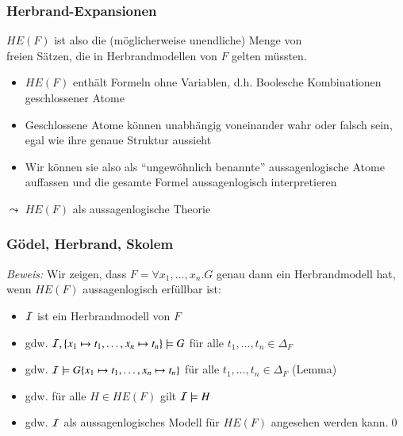\documentclass[aspectratio=1610,onlymath]{beamer}
\begin{document}
\begin{frame}\frametitle{Herbrand-Expansionen}


$HE(F)$ ist also die (möglicherweise unendliche) Menge von \\ freien Sätzen, die in Herbrandmodellen von $F$ gelten müssten.
\pause\bigskip

\begin{itemize}
\item $HE(F)$ enthält Formeln ohne Variablen, d.h. Boolesche Kombinationen geschlossener Atome
\item Geschlossene Atome können unabhängig voneinander wahr oder falsch sein, egal wie ihre genaue Struktur aussieht
\item Wir können sie also als "`ungewöhnlich benannte"' aussagenlogische Atome auffassen und die gesamte Formel aussagenlogisch interpretieren
\end{itemize}
\alert{$\leadsto$ $HE(F)$ als aussagenlogische Theorie}


\end{frame}

\begin{frame}\frametitle{Gödel, Herbrand, Skolem}

\pause

\emph{Beweis:} Wir zeigen, dass $F=\forall x_1,\ldots,x_n.G$ genau dann ein Herbrandmodell hat, wenn $HE(F)$ aussagenlogisch erfüllbar ist:\pause

\begin{itemize}
\item $\mathcal{I}$ ist ein Herbrandmodell von $F$\pause
\item gdw. $\mathcal{I},\{x_1\mapsto t_1,\ldots,x_n\mapsto t_n\}\models G$ für alle $t_1,\ldots,t_n\in\Delta_F$\pause
\item gdw. $\mathcal{I}\models G\{x_1\mapsto t_1,\ldots,x_n\mapsto t_n\}$ für alle $t_1,\ldots,t_n\in\Delta_F$ (Lemma)\pause
\item gdw. für alle $H\in HE(F)$ gilt $\mathcal{I}\models H$\pause
\item gdw. $\mathcal{I}$ als aussagenlogisches Modell für $HE(F)$ angesehen werden kann.\qed
\end{itemize}

\end{frame}
\end{document}
